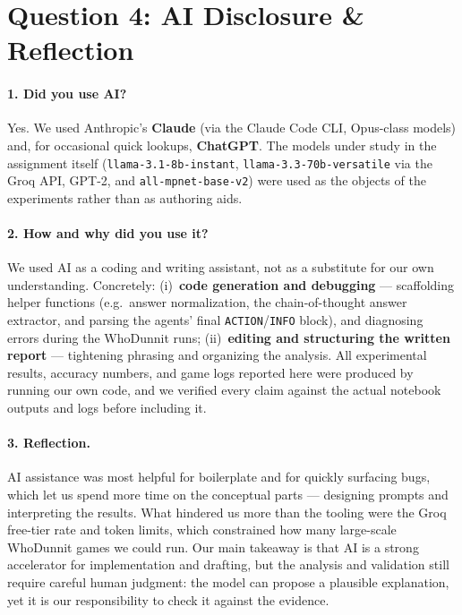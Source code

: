 \documentclass[11pt]{article}
\begin{document}
\newpage
\section*{Question 4: AI Disclosure \& Reflection}

\paragraph{1. Did you use AI?}
Yes. We used Anthropic's \textbf{Claude} (via the Claude Code CLI, Opus-class models) and,
for occasional quick lookups, \textbf{ChatGPT}. The models under study in the assignment
itself (\texttt{llama-3.1-8b-instant}, \texttt{llama-3.3-70b-versatile} via the Groq API, GPT-2,
and \texttt{all-mpnet-base-v2}) were used as the objects of the experiments rather than as
authoring aids.

\paragraph{2. How and why did you use it?}
We used AI as a coding and writing assistant, not as a substitute for our own understanding.
Concretely: (i)~\textbf{code generation and debugging} --- scaffolding helper functions
(e.g.\ answer normalization, the chain-of-thought answer extractor, and parsing the agents'
final \texttt{ACTION}/\texttt{INFO} block), and diagnosing errors during the WhoDunnit runs;
(ii)~\textbf{editing and structuring the written report} --- tightening
phrasing and organizing the analysis. All experimental results, accuracy numbers, and game
logs reported here were produced by running our own code, and we verified every claim against
the actual notebook outputs and logs before including it.

\paragraph{3. Reflection.}
AI assistance was most helpful for boilerplate and for quickly surfacing bugs, which let us
spend more time on the conceptual parts --- designing prompts and interpreting the results.
What hindered us more than the tooling were the Groq free-tier rate and token limits, which
constrained how many large-scale WhoDunnit games we could run. Our main takeaway is that AI is
a strong accelerator for implementation and drafting, but the analysis and validation still
require careful human judgment: the model can propose a plausible explanation, yet it is our
responsibility to check it against the evidence.
\end{document}
